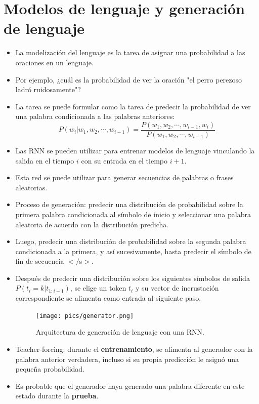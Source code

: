 \documentclass{book}
\begin{document}
\section{Modelos de lenguaje y generación de lenguaje}
\begin{itemize}
\item La modelización del lenguaje es la tarea de asignar una probabilidad a las oraciones en un lenguaje.
\item Por ejemplo, ¿cuál es la probabilidad de ver la oración "el perro perezoso ladró ruidosamente"?
\item La tarea se puede formular como la tarea de predecir la probabilidad de ver una palabra condicionada a las palabras anteriores:
\begin{displaymath}
P(w_i | w_1, w_2, \cdots, w_{i-1}) = \frac{P(w_1, w_2, \cdots, w_{i-1}, w_i)}{P(w_1, w_2, \cdots, w_{i-1})}
\end{displaymath}
\item Las RNN se pueden utilizar para entrenar modelos de lenguaje vinculando la salida en el tiempo $i$ con su entrada en el tiempo $i + 1$.
\item Esta red se puede utilizar para generar secuencias de palabras o frases aleatorias.
\item Proceso de generación: predecir una distribución de probabilidad sobre la primera palabra condicionada al símbolo de inicio y seleccionar una palabra aleatoria de acuerdo con la distribución predicha.
\item Luego, predecir una distribución de probabilidad sobre la segunda palabra condicionada a la primera, y así sucesivamente, hasta predecir el símbolo de fin de secuencia $</$s$>$.
\item Después de predecir una distribución sobre los siguientes símbolos de salida $P(t_i = k | t_{1:i-1})$, se elige un token $t_i$ y su vector de incrustación correspondiente se alimenta como entrada al siguiente paso.
         \begin{figure}[h]
        	\centering
        	\texttt{[image: pics/generator.png]}
        	\caption{Arquitectura de generación de lenguaje con una RNN.}
        \end{figure}
\item Teacher-forcing: durante el \textbf{entrenamiento}, se alimenta al generador con la palabra anterior verdadera, incluso si su propia predicción le asignó una pequeña probabilidad.
\item Es probable que el generador haya generado una palabra diferente en este estado durante la \textbf{prueba}.
\end{itemize}
\end{document}
